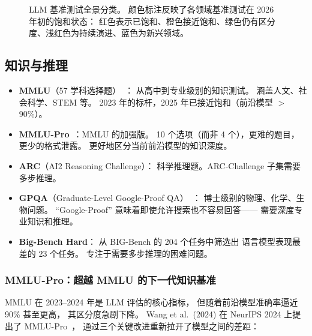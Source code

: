 \begin{figure}[htbp]
\begin{tikzpicture}
\end{tikzpicture}
\caption{LLM 基准测试全景分类。
颜色标注反映了各领域基准测试在 2026 年初的饱和状态：
红色表示已饱和、橙色接近饱和、绿色仍有区分度、浅红色为持续演进、蓝色为新兴领域。}
\label{fig:benchmark-taxonomy}
\end{figure}

\subsection{知识与推理}
\begin{itemize}[noitemsep]
  \item \textbf{MMLU}（57 学科选择题）~\cite{hendrycks2021mmlu}：
        从高中到专业级别的知识测试。
        涵盖人文、社会科学、STEM 等。
        2023 年的标杆，2025 年已接近饱和（前沿模型 $>$90\%）。
  \item \textbf{MMLU-Pro}~\cite{wang2024mmlupro}：MMLU 的加强版。
        10 个选项（而非 4 个），更难的题目，更少的格式泄露。
        更好地区分当前前沿模型的知识深度。
  \item \textbf{ARC}（AI2 Reasoning Challenge）：
        科学推理题。ARC-Challenge 子集需要多步推理。
  \item \textbf{GPQA}（Graduate-Level Google-Proof QA）~\cite{rein2024gpqa}：
        博士级别的物理、化学、生物问题。
        “Google-Proof” 意味着即使允许搜索也不容易回答——
        需要深度专业知识和推理。
  \item \textbf{Big-Bench Hard}：
        从 BIG-Bench 的 204 个任务中筛选出
        语言模型表现最差的 23 个任务。
        专注于需要多步推理的困难问题。
\end{itemize}

\subsubsection{MMLU-Pro：超越 MMLU 的下一代知识基准}

MMLU 在 2023--2024 年是 LLM 评估的核心指标，
但随着前沿模型准确率逼近 90\% 甚至更高，
其区分度急剧下降。
Wang et al.\ (2024) 在 NeurIPS 2024 上提出了 MMLU-Pro~\cite{wang2024mmlupro}，
通过三个关键改进重新拉开了模型之间的差距：

